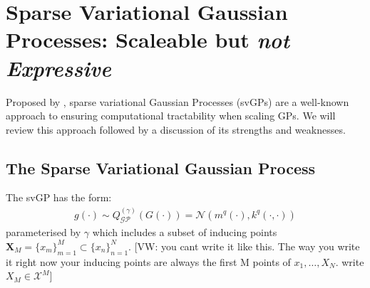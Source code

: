\documentclass{article}
\newcommand{\vw}[1]{{\color{green} [VW: #1]}}
\newcommand{\GP}{\operatorname{\mathcal{GP}}}
\numberwithin{equation}{section}
\begin{document}
\section{Sparse Variational Gaussian Processes: Scaleable but \textit{not Expressive}}






Proposed by \cite{titsias2009variational}, sparse variational Gaussian Processes (svGPs) are a well-known approach to ensuring computational tractability when scaling GPs. We will review this approach followed by a discussion of its strengths and weaknesses.




\subsection{The Sparse Variational Gaussian Process}



The svGP has the form:
\begin{align}
g(\cdot) \sim Q^{(\gamma)}_{\GP}(G(\cdot)) = \mathcal{N}\left(m^{q}(\cdot), k^{q}(\cdot, \cdot)\right)
\label{svgp}
\end{align}
parameterised by $\gamma$ which includes a subset of inducing points $\mathbf{X}_M = \{x_m\}_{m=1}^{M} \subset \{x_n\}_{n=1}^{N}$. \vw{you cant write it like this. The way you write it right now your inducing points are always the first M points of $x_1,\hdots,X_N$. write $X_M \in \mathcal{X}^M$}
\end{document}
